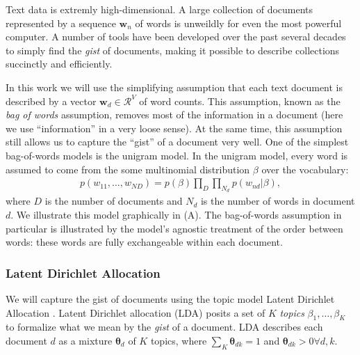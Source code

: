   Text data is extremly high-dimensional.  A large collection of
  documents represented by a sequence $\bm w_n$ of words is unweildly
  for even the most powerful computer.  A number of tools have been
  developed over the past several decades to simply find the
  \emph{gist} of documents, making it possible to describe collections
  succinctly and efficiently.

  In this work we will use the simplifying assumption that each text
  document is described by a vector $\bm w_d \in \mathcal{R}^V$ of
  word counts.  This assumption, known as the \emph{bag of words}
  assumption, removes most of the information in a document (here we
  use ``information'' in a very loose sense).  At the same time, this
  assumption still allows us to capture the ``gist'' of a document
  very well. One of the simplest bag-of-words models is the unigram
  model. In the unigram model, every word is assumed to come from the
  some multinomial distribution $\beta$ over the vocabulary:
  \begin{align*}
    p(w_{11}, \ldots, w_{ND}) = p(\beta) \prod_D \prod_{N_d} p(w_{nd} |
  \beta),
\end{align*}
  where $D$ is the number of documents and $N_d$ is the number of
  words in document $d$.
  We illustrate this model graphically in
   (A).  The bag-of-words assumption in
  particular is illustrated by the model's agnostic treatment of the
  order between words: these words are fully exchangeable within each
  document.

\subsubsection{Latent Dirichlet Allocation}
We will capture the gist of documents using the topic model Latent
Dirichlet Allocation \citep{blei:2003}.  Latent Dirichlet allocation
(LDA) posits a set of $K$ \emph{topics} $\beta_1, \ldots, \beta_K$ to
formalize what we mean by the \emph{gist} of a document.  LDA
describes each document $d$ as a mixture $\bm \theta_d$ of $K$ topics,
where $\sum_K \bm \theta_{dk} = 1$ and $\bm \theta_{dk} > 0
\forall d,k$.


